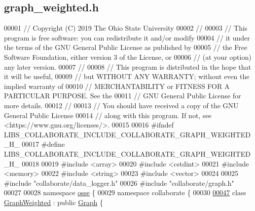 \hypertarget{graph__weighted_8h_source}{}\subsection{graph\+\_\+weighted.\+h}
\label{graph__weighted_8h_source}

\begin{DoxyCode}
00001 \textcolor{comment}{// Copyright (C) 2019 The Ohio State University}
00002 \textcolor{comment}{//}
00003 \textcolor{comment}{// This program is free software: you can redistribute it and/or modify}
00004 \textcolor{comment}{// it under the terms of the GNU General Public License as published by}
00005 \textcolor{comment}{// the Free Software Foundation, either version 3 of the License, or}
00006 \textcolor{comment}{// (at your option) any later version.}
00007 \textcolor{comment}{//}
00008 \textcolor{comment}{// This program is distributed in the hope that it will be useful,}
00009 \textcolor{comment}{// but WITHOUT ANY WARRANTY; without even the implied warranty of}
00010 \textcolor{comment}{// MERCHANTABILITY or FITNESS FOR A PARTICULAR PURPOSE.  See the}
00011 \textcolor{comment}{// GNU General Public License for more details.}
00012 \textcolor{comment}{//}
00013 \textcolor{comment}{// You should have received a copy of the GNU General Public License}
00014 \textcolor{comment}{// along with this program.  If not, see <https://www.gnu.org/licenses/>.}
00015 
00016 \textcolor{preprocessor}{#ifndef LIBS\_COLLABORATE\_INCLUDE\_COLLABORATE\_GRAPH\_WEIGHTED\_H\_}
00017 \textcolor{preprocessor}{#define LIBS\_COLLABORATE\_INCLUDE\_COLLABORATE\_GRAPH\_WEIGHTED\_H\_}
00018 
00019 \textcolor{preprocessor}{#include <array>}
00020 \textcolor{preprocessor}{#include <cstdint>}
00021 \textcolor{preprocessor}{#include <memory>}
00022 \textcolor{preprocessor}{#include <string>}
00023 \textcolor{preprocessor}{#include <vector>}
00024 
00025 \textcolor{preprocessor}{#include "collaborate/data\_logger.h"}
00026 \textcolor{preprocessor}{#include "collaborate/graph.h"}
00027 
00028 \textcolor{keyword}{namespace }\hyperlink{namespaceosse}{osse} \{
00029 \textcolor{keyword}{namespace }collaborate \{
00030 
\hyperlink{classosse_1_1collaborate_1_1_graph_weighted}{00047} \textcolor{keyword}{class }\hyperlink{classosse_1_1collaborate_1_1_graph_weighted}{GraphWeighted} : \textcolor{keyword}{public} \hyperlink{classosse_1_1collaborate_1_1_graph}{Graph} \{

\end{DoxyCode}
